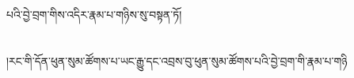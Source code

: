 པའི་བྱེ་བྲག་གིས་འདིར་རྣམ་པ་གཉིས་སུ་བསྟན་ཏོ།\chapter{ }།རང་གི་དོན་ཕུན་སུམ་ཚོགས་པ་ཡང་རྒྱུ་དང་འབྲས་བུ་ཕུན་སུམ་ཚོགས་པའི་བྱེ་བྲག་གི་རྣམ་པ་གཉི